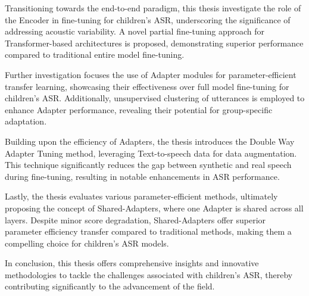 Transitioning towards the end-to-end paradigm, this thesis investigate the role of the Encoder in fine-tuning for children's ASR, underscoring the significance of addressing acoustic variability. A novel partial fine-tuning approach for Transformer-based architectures is proposed, demonstrating superior performance compared to traditional entire model fine-tuning.

Further investigation focuses the use of Adapter modules for parameter-efficient transfer learning, showcasing their effectiveness over full model fine-tuning for children's ASR. Additionally, unsupervised clustering of utterances is employed to enhance Adapter performance, revealing their potential for group-specific adaptation.

Building upon the efficiency of Adapters, the thesis introduces the Double Way Adapter Tuning method, leveraging Text-to-speech data for data augmentation. This technique significantly reduces the gap between synthetic and real speech during fine-tuning, resulting in notable enhancements in ASR performance.

Lastly, the thesis evaluates various parameter-efficient methods, ultimately proposing the concept of Shared-Adapters, where one Adapter is shared across all layers. Despite minor score degradation, Shared-Adapters offer superior parameter efficiency transfer compared to traditional methods, making them a compelling choice for children's ASR models.

In conclusion, this thesis offers comprehensive insights and innovative methodologies to tackle the challenges associated with children's ASR, thereby contributing significantly to the advancement of the field.
\newpage